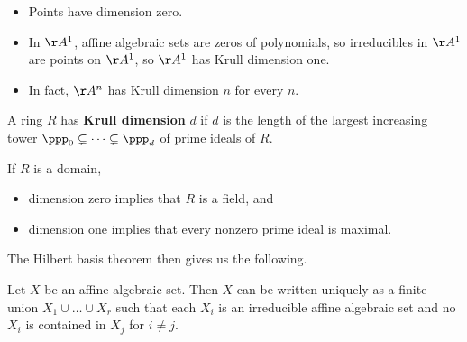 \begin{example*}
\hfill
\begin{itemize}
\item Points have dimension zero.
\item In $ \AA^1 $, affine algebraic sets are zeros of polynomials, so irreducibles in $ \AA^1 $ are points on $ \AA^1 $, so $ \AA^1 $ has Krull dimension one.
\item In fact, $ \AA^n $ has Krull dimension $ n $ for every $ n $.
\end{itemize}
\end{example*}

\begin{definition}
A ring $ R $ has \textbf{Krull dimension} $ d $ if $ d $ is the length of the largest increasing tower $ \ppp_0 \subsetneq \dots \subsetneq \ppp_d $ of prime ideals of $ R $.
\end{definition}

\begin{example*}
If $ R $ is a domain,
\begin{itemize}
\item dimension zero implies that $ R $ is a field, and
\item dimension one implies that every nonzero prime ideal is maximal.
\end{itemize}
\end{example*}

The Hilbert basis theorem then gives us the following.

\begin{proposition}
Let $ X $ be an affine algebraic set. Then $ X $ can be written uniquely as a finite union $ X_1 \cup \dots \cup X_r $ such that each $ X_i $ is an irreducible affine algebraic set and no $ X_i $ is contained in $ X_j $ for $ i \ne j $.
\end{proposition}

